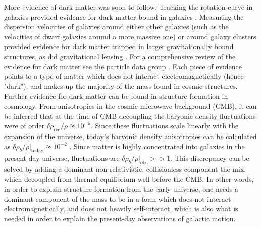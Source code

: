 More evidence of dark matter was soon to follow. Tracking the rotation curve in galaxies provided evidence for dark matter bound in galaxies \cite{Sofue2020, Sofue_2016, history_of_dark_matter}. Measuring the dispersion velocities of galaxies around either other galaxies (such as the velocities of dwarf galaxies around a more massive one) or around galaxy clusters provided evidence for dark matter trapped in larger gravitationally bound structures, as did gravitational lensing \cite{Cluster_lenses}. For a comprehensive review of the evidence for dark matter see the particle data group \cite{PDG2022}. Each piece of evidence points to a type of matter which does not interact electromagnetically (hence "dark"), and makes up the majority of the mass found in cosmic structures. \\

Further evidence for dark matter can be found in structure formation in cosmology. From anisotropies in the cosmic microwave background (CMB), it can be inferred that at the time of CMB decoupling the baryonic density fluctuations were of order $\delta\rho_\mathrm{rec} / \rho \approxeq 10^{-5}$. Since these fluctuations scale linearly with the expansion of the universe, today's baryonic density anisotropies can be calculated as $\delta\rho_b / \rho |_\mathrm{today}\approxeq 10^{-2}$ \cite{PDG2022}. Since matter is highly concentrated into galaxies in the present day universe, fluctuations are $\delta\rho_b / \rho |_\mathrm{obs}>> 1$. This discrepancy can be solved by adding a dominant non-relativistic, collisionless component the mix, which decoupled from thermal equilibrium well before the CMB. In other words, in order to explain structure formation from the early universe, one needs a dominant component of the mass to be in a form which does not interact electromagnetically, and does not heavily self-interact, which is also what is needed in order to explain the present-day observations of galactic motion. \\

